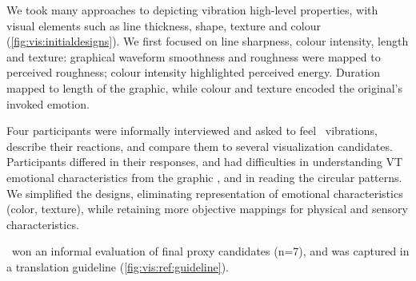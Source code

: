  We took many approaches to depicting vibration high-level properties, with visual elements such as line thickness, shape, texture and colour (\autoref{fig:vis:initialdesigns}).
        We first focused on line sharpness, colour intensity, length and texture:
        graphical waveform smoothness and roughness were mapped to perceived roughness; 
        colour intensity highlighted  perceived energy.
        Duration mapped to length of the graphic, while colour and texture encoded the original's invoked emotion.

    Four participants were informally interviewed and asked to feel \hifi~vibrations, describe their reactions, and compare them to several visualization  candidates.
         Participants differed in their responses, and  had difficulties in understanding VT emotional characteristics from the graphic , and in reading the circular patterns. 
       We simplified the designs, eliminating representation of emotional characteristics (color, texture), while retaining more objective mappings for physical and sensory characteristics. %
       
       \linear~won an informal evaluation of final proxy candidates (n=7), and was captured in a translation guideline
       (\autoref{fig:vis:ref:guideline}).
     
    
     
